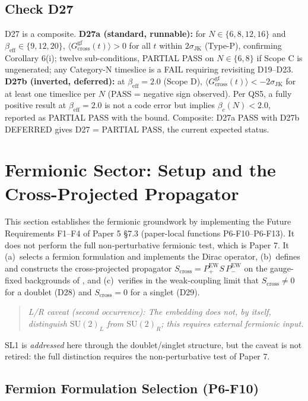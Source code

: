 \documentclass[11pt,a4paper]{article}
\theoremstyle{plain}
\theoremstyle{definition}
\theoremstyle{remark}
\newcommand{\SU}{\mathrm{SU}}
\newcommand{\Gcrossgf}{G_{\mathrm{cross}}^{\mathrm{gf}}}
\newcommand{\Scross}{S_{\mathrm{cross}}}
\newcommand{\be}{\beta_{\mathrm{eff}}}
\newcommand{\bc}{\beta_{c}}
\newcommand{\Pew}{P^{\mathrm{EW}}}
\begin{document}
\subsection{Check D27}
\label{ssec:D27}

D27 is a composite. \textbf{D27a (standard, runnable):} for
$N\in\{6,8,12,16\}$ and $\be\in\{9,12,20\}$,
$\langle\Gcrossgf(t)\rangle>0$ for all $t$ within $2\sigma_{\mathrm{JK}}$
(Type-P), confirming Corollary 6(i); twelve sub-conditions, PARTIAL PASS
on $N\in\{6,8\}$ if Scope C is ungenerated; any Category-N timeslice is a
FAIL requiring revisiting D19--D23. \textbf{D27b (inverted, deferred):}
at $\be=2.0$ (Scope D), $\langle\Gcrossgf(t)\rangle<-2\sigma_{\mathrm{JK}}$
for at least one timeslice per $N$ (PASS = negative sign observed). Per
QS5, a fully positive result at $\be=2.0$ is not a code error but implies
$\bc(N)<2.0$, reported as PARTIAL PASS with the bound. Composite: D27a
PASS with D27b DEFERRED gives D27 = PARTIAL PASS, the current expected
status.

\section{Fermionic Sector: Setup and the Cross-Projected Propagator}
\label{sec:fermionic}

This section establishes the fermionic groundwork by implementing the
Future Requirements F1--F4 of Paper 5 \S7.3 (paper-local functions
P6-F10--P6-F13). It does not perform the full non-perturbative fermionic
test, which is Paper 7. It (a)~selects a fermion formulation and
implements the Dirac operator, (b)~defines and constructs the
cross-projected propagator $\Scross=\Pew_{+}S\,\Pew_{-}$ on the
gauge-fixed backgrounds of , and
(c)~verifies in the weak-coupling limit that $\Scross\ne0$ for a doublet
(D28) and $\Scross=0$ for a singlet (D29).

\begin{quote}\itshape
L/R caveat (second occurrence): The embedding does not, by itself,
distinguish $\SU(2)_L$ from $\SU(2)_R$; this requires external fermionic
input.
\end{quote}

\noindent
SL1 is \emph{addressed} here through the doublet/singlet structure, but
the caveat is not retired: the full distinction requires the
non-perturbative test of Paper 7.

\subsection{Fermion Formulation Selection (P6-F10)}
\label{ssec:formulation}
\end{document}
